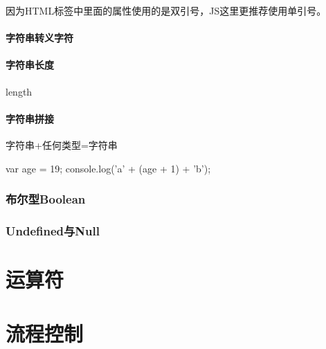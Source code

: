 因为HTML标签中里面的属性使用的是双引号，JS这里更推荐使用单引号。
\paragraph{字符串转义字符}
\paragraph{字符串长度}
length
\paragraph{字符串拼接}
字符串+任何类型=字符串
\begin{js}
var age = 19;
console.log('a' + (age + 1) + 'b');
\end{js}

\subsubsection{布尔型Boolean}
\subsubsection{Undefined与Null}
\section{运算符}
\section{流程控制}






